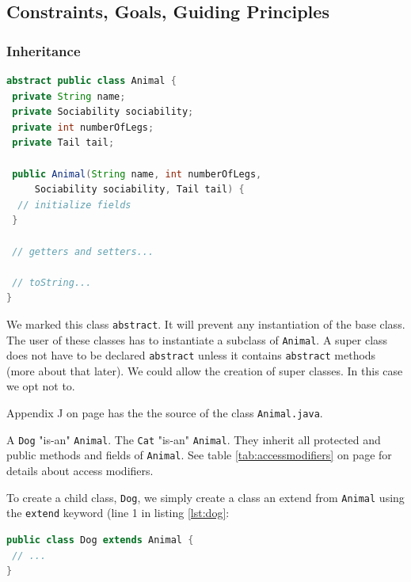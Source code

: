 \subsection{Constraints, Goals, Guiding Principles}

\subsubsection{Inheritance}\label{s:inheritance}

\begin{lstlisting}[language=Java]
abstract public class Animal {
 private String name;
 private Sociability sociability;
 private int numberOfLegs;
 private Tail tail;

 public Animal(String name, int numberOfLegs, 
     Sociability sociability, Tail tail) {
  // initialize fields
 }

 // getters and setters...
 
 // toString...
}
\end{lstlisting}

We marked this class \texttt{abstract}. It will prevent any instantiation of the base class. The user of these classes has to instantiate a subclass of \texttt{Animal}. A super class does not have to be declared \texttt{abstract} unless it contains \texttt{abstract} methods (more about that later). We could allow the creation of super classes. In this case we opt not to.

Appendix J on page \pageref{App:AppendixJ} has the the source of the class \texttt{Animal.java}.

A \texttt{Dog} "is-an" \texttt{Animal}. The \texttt{Cat} "is-an" \texttt{Animal}. They inherit all protected and public methods and fields of \texttt{Animal}. See table \ref{tab:accessmodifiers} on page \pageref{tab:accessmodifiers} for details about access modifiers.

To create a child class, \texttt{Dog}, we simply create a class an extend from \texttt{Animal} using the \texttt{extend} keyword (line 1 in listing \ref{lst:dog}:

\begin{lstlisting}[language=Java, label=lst:dog]
public class Dog extends Animal {
 // ...
}
\end{lstlisting}

